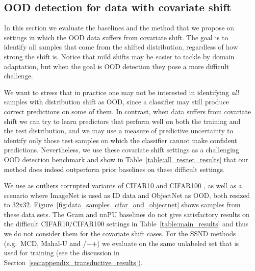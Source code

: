 \vspace{-0.5cm}
\subsection{OOD detection for data with covariate shift}
\label{sec:appendix_cov_shift}

\vspace{-0.2cm}
In this section we evaluate the baselines and the method that we propose on
settings in which the OOD data suffers from covariate shift.
The goal is to identify all samples that come from the shifted distribution,
regardless of how strong the shift is. Notice that mild shifts may be easier to
tackle by domain adaptation, but when the goal is OOD detection they
pose a more difficult challenge.

We want to stress that in practice one may not be interested in identifying
\emph{all} samples with distribution shift as OOD, since a classifier may still
produce correct predictions on some of them. 
In contrast, when data suffers from covariate shift we can try to learn
predictors that perform well on both the training and the test distribution, and
we may use a measure of predictive uncertainty to identify only those test
samples on which the classifier cannot make confident predictions. Nevertheless,
we use these covariate shift settings as a challenging OOD detection benchmark
and show in Table~\ref{table:all_resnet_results} that our method  does
indeed outperform prior baselines on these difficult settings.

We use as outliers corrupted variants of CIFAR10 and CIFAR100 \citep{cifar_c}, as
well as a scenario where ImageNet \citep{Deng2009} is used as ID data and
ObjectNet \citep{Barbu2019} as OOD, both resized to 32x32.
Figure~\ref{fig:data_samples_cifar_and_objectnet} shows samples from these data
sets. The Gram and nnPU baselines do not give satisfactory results on the
difficult CIFAR10/CIFAR100 settings in Table~\ref{table:main_results} and thus
we do not consider them for the covariate shift cases.  For the SSND methods
(e.g.\ MCD, Mahal-U and /++) we evaluate on the same unlabeled
set that is used for training (see the discussion in
Section~\ref{sec:appendix_transductive_results}).


